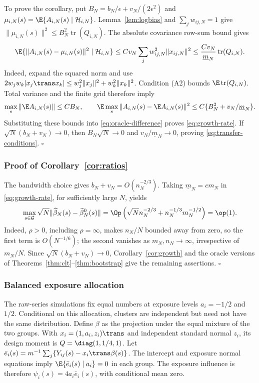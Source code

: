 To prove the corollary, put $B_N=b_N/\epsilon+v_N/(2\epsilon^2)$ and $\mu_{i,N}(s)=\E\{A_{i,N}(s)\mid\mathcal H_{i,N}\}$. Lemma~\ref{lem:logbias} and $\sum_jw_{ij,N}=1$ give $\|\mu_{i,N}(s)\|^2\leq B_N^2\operatorname{tr}(Q_{i,N})$. The absolute covariance row-sum bound gives
\[
 \E\{\|A_{i,N}(s)-\mu_{i,N}(s)\|^2\mid\mathcal H_{i,N}\}
 \leq Cv_N\sum_jw_{ij,N}^2\|x_{ij,N}\|^2
 \leq\frac{Cv_N}{\underline m_N}\operatorname{tr}(Q_{i,N}).
\]
Indeed, expand the squared norm and use $2w_jw_k|x_j\trans x_k|\leq w_j^2\|x_j\|^2+w_k^2\|x_k\|^2$. Condition (A2) bounds $\E\operatorname{tr}(Q_{i,N})$. Total variance and the finite grid therefore imply
\[
 \max_s\|\E A_{i,N}(s)\|\leq CB_N,
 \qquad
 \E\max_s\|A_{i,N}(s)-\E A_{i,N}(s)\|^2
 \leq C\{B_N^2+v_N/\underline m_N\}.
\]
Substituting these bounds into \eqref{eq:oracle-difference} proves \eqref{eq:growth-rate}. If $\sqrt N(b_N+v_N)\to0$, then $B_N\sqrt N\to0$ and $v_N/\underline m_N\to0$, proving \eqref{eq:transfer-conditions}. \hfill$\square$

\subsubsection*{Proof of Corollary~\ref{cor:ratios}}
The bandwidth choice gives $b_N+v_N=O(n_N^{-2/3})$. Taking $\underline m_N=cm_N$ in \eqref{eq:growth-rate}, for sufficiently large $N$, yields
\[
 \max_{s\in\mathcal G}\sqrt N\|\widehat\beta_N(s)-\widetilde\beta_N^0(s)\|
 =\Op\left(\sqrt N n_N^{-2/3}+n_N^{-1/3}m_N^{-1/2}\right)=\op(1).
\]
Indeed, $\rho>0$, including $\rho=\infty$, makes $n_N/N$ bounded away from zero, so the first term is $O(N^{-1/6})$; the second vanishes as $m_N,n_N\to\infty$, irrespective of $m_N/N$. Since $\sqrt N(b_N+v_N)\to0$, Corollary~\ref{cor:growth} and the oracle versions of Theorems~\ref{thm:clt}--\ref{thm:bootstrap} give the remaining assertions. \hfill$\square$

\subsubsection*{Balanced exposure allocation}
The raw-series simulations fix equal numbers at exposure levels $a_i=-1/2$ and $1/2$. Conditional on this allocation, clusters are independent but need not have the same distribution. Define $\beta$ as the projection under the equal mixture of the two groups. With $x_i=(1,a_i,z_i)\trans$ and independent standard normal $z_i$, its design moment is $Q=\diag(1,1/4,1)$. Let $\bar e_i(s)=m^{-1}\sum_j\{Y_{ij}(s)-x_i\trans\beta(s)\}$. The intercept and exposure normal equations imply $\E\{\bar e_i(s)\mid a_i\}=0$ in each group. The exposure influence is therefore $\psi_i(s)=4a_i\bar e_i(s)$, with conditional mean zero.

